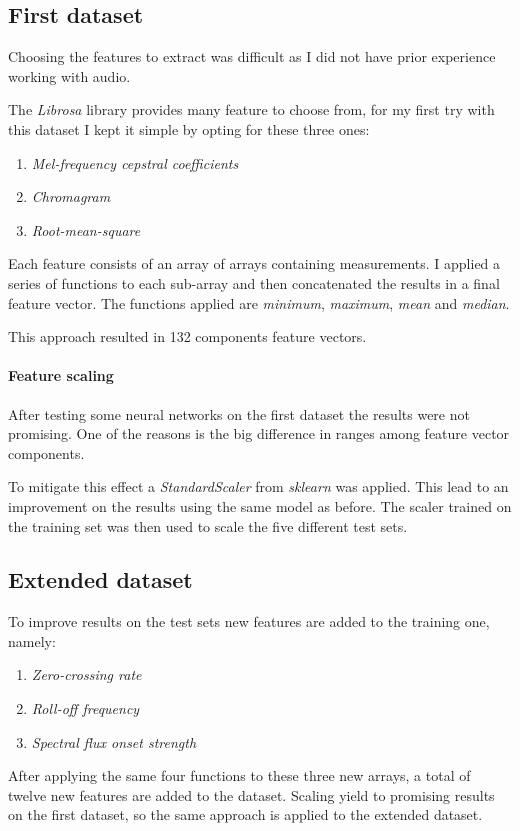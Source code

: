 \subsection{First dataset}
Choosing the features to extract was difficult as I did not have 
prior experience working with audio. 

The \emph{Librosa} library provides many feature to choose from, 
for my first try with this dataset I kept it simple 
by opting for these three ones: 
\begin{enumerate}
    \item \emph{Mel-frequency cepstral coefficients}
    \item \emph{Chromagram}
    \item \emph{Root-mean-square}
\end{enumerate}
Each feature consists of an array of arrays containing measurements. 
I applied a series of functions to each sub-array and then concatenated 
the results in a final feature vector. 
The functions applied are \emph{minimum}, \emph{maximum}, \emph{mean} and \emph{median}.

This approach resulted in 132 components feature vectors.

\paragraph{Feature scaling}
After testing some neural networks on the first dataset the results 
were not promising. One of the reasons is the big difference in 
ranges among feature vector components.

To mitigate this effect a \emph{StandardScaler} from \emph{sklearn} was applied.
This lead to an improvement on the results using the same 
model as before. 
The scaler trained on the training set was then 
used to scale the five different test sets.

\subsection{Extended dataset}
To improve results on the test sets new features are added 
to the training one, namely: 
\begin{enumerate}
    \item \emph{Zero-crossing rate}
    \item \emph{Roll-off frequency}
    \item \emph{Spectral flux onset strength}
\end{enumerate}
After applying the same four functions to these three new arrays, 
a total of twelve new features are added to the dataset.
Scaling yield to promising results on the first dataset, 
so the same approach is applied to the extended dataset.


